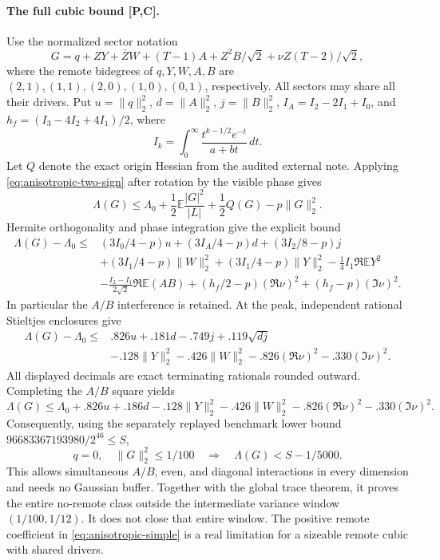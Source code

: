 \paragraph{The full cubic bound [P,C].}
Use the normalized sector notation
\[
 G=q+ZY+\bar ZW+(T-1)A+Z^2B/\sqrt2+\nu Z(T-2)/\sqrt2,
\]
where the remote bidegrees of $q,Y,W,A,B$ are
$(2,1),(1,1),(2,0),(1,0),(0,1)$, respectively.
All sectors may share all their drivers. Put
$u=\|q\|_2^2$, $d=\|A\|_2^2$, $j=\|B\|_2^2$,
$I_A=I_2-2I_1+I_0$, and $h_f=(I_3-4I_2+4I_1)/2$, where
\[
 I_k=\int_0^\infty\frac{t^{k-1/2}e^{-t}}{a+bt}\,dt.
\]
Let $Q$ denote the exact origin Hessian from the audited external note.
Applying \eqref{eq:anisotropic-two-sign} after rotation by the visible phase gives
\[
 \Lambda(G)\le\Lambda_0+\frac12\mathbb E\frac{|G|^2}{|L|}
                  +\frac12Q(G)-p\|G\|_2^2.
\]
Hermite orthogonality and phase integration give the explicit bound
\begin{align*}
 \Lambda(G)-\Lambda_0\le{}&
 (3I_0/4-p)u+(3I_A/4-p)d+(3I_2/8-p)j\\
 &+(3I_1/4-p)\|W\|_2^2
 +(3I_1/4-p)\|Y\|_2^2-\tfrac14I_1\Re\mathbb E Y^2\\
 &-\frac{I_2-I_1}{2\sqrt2}\Re\mathbb E(AB)
 +(h_f/2-p)(\Re\nu)^2+(h_f-p)(\Im\nu)^2.
\end{align*}
In particular the $A/B$ interference is retained. At the peak, independent
rational Stieltjes enclosures give
\begin{align*}
 \Lambda(G)-\Lambda_0\le{}&
 .826u+.181d-.749j+.119\sqrt{dj}\\
 &-.128\|Y\|_2^2-.426\|W\|_2^2
 -.826(\Re\nu)^2-.330(\Im\nu)^2.
\end{align*}
All displayed decimals are exact terminating rationals rounded outward.
Completing the $A/B$ square yields
\begin{equation}
 \boxed{\Lambda(G)\le\Lambda_0+.826u+.186d
 -.128\|Y\|_2^2-.426\|W\|_2^2-.826(\Re\nu)^2-.330(\Im\nu)^2.}
 \label{eq:anisotropic-simple}
\end{equation}
Consequently, using the separately replayed benchmark lower bound
$96683367193980/2^{46}\le S$,
\begin{equation}
 \boxed{q=0,\quad \|G\|_2^2\le1/100
 \quad\Longrightarrow\quad \Lambda(G)<S-1/5000.}
 \label{eq:anisotropic-small-visible}
\end{equation}
This allows simultaneous $A/B$, even, and diagonal interactions in every
dimension and needs no Gaussian buffer. Together with the global trace
theorem, it proves the entire no-remote class outside the intermediate
variance window $(1/100,1/12)$. It does not close that entire window.
The positive remote coefficient in \eqref{eq:anisotropic-simple} is a real
limitation for a sizeable remote cubic with shared drivers.

